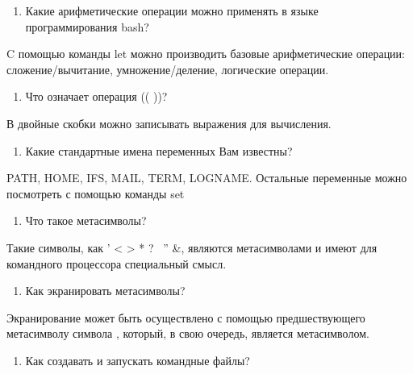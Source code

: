 \begin{enumerate}
\def\labelenumi{\arabic{enumi}.}
\setcounter{enumi}{4}
\tightlist
\item
  Какие арифметические операции можно применять в языке программирования
  bash?
\end{enumerate}

C помощью команды let можно производить базовые арифметические операции:
сложение/вычитание, умножение/деление, логические операции.

\begin{enumerate}
\def\labelenumi{\arabic{enumi}.}
\setcounter{enumi}{5}
\tightlist
\item
  Что означает операция (( ))?
\end{enumerate}

В двойные скобки можно записывать выражения для вычисления.

\begin{enumerate}
\def\labelenumi{\arabic{enumi}.}
\setcounter{enumi}{6}
\tightlist
\item
  Какие стандартные имена переменных Вам известны?
\end{enumerate}

PATH, HOME, IFS, MAIL, TERM, LOGNAME. Остальные переменные можно
посмотреть с помощью команды set

\begin{enumerate}
\def\labelenumi{\arabic{enumi}.}
\setcounter{enumi}{7}
\tightlist
\item
  Что такое метасимволы?
\end{enumerate}

Такие символы, как ' \textless{} \textgreater{} * ? \textbar{} ~'' \&,
являются метасимволами и имеют для командного процессора специальный
смысл.

\begin{enumerate}
\def\labelenumi{\arabic{enumi}.}
\setcounter{enumi}{8}
\tightlist
\item
  Как экранировать метасимволы?
\end{enumerate}

Экранирование может быть осуществлено с помощью предшествующего
метасимволу символа , который, в свою очередь, является метасимволом.

\begin{enumerate}
\def\labelenumi{\arabic{enumi}.}
\setcounter{enumi}{9}
\tightlist
\item
  Как создавать и запускать командные файлы?
\end{enumerate}

